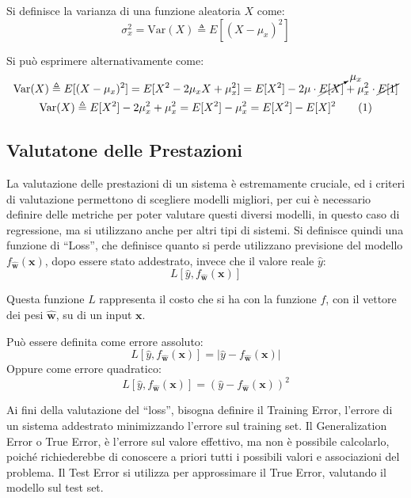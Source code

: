 \documentclass{article}
\numberwithin{equation}{subsection}
\newcommand{\tageq}{\tag{\stepcounter{equation}\theequation}}
\newcommand{\vect}[1]{\boldsymbol{\mathbf{#1}}}
\begin{document}
Si definisce la varianza di una funzione aleatoria $X$ come:
\begin{equation}
    \sigma^2_x=\text{Var}(X)\triangleq E[(X-\mu_x)^2]
\end{equation}

Si può esprimere alternativamente come:
\begin{gather*}
    \text{Var}(X)\triangleq E[(X-\mu_x)^2]=E[X^2-2\mu_xX+\mu_x^2]=E[X^2]-2\mu\cdot\cancelto{\mu_x}{E[X]}+\mu_x^2\cdot\cancel{E[1]}\\
    \text{Var}(X)\triangleq E[X^2]-2\mu_x^2+\mu_x^2=E[X^2]-\mu_x^2=E[X^2]-E[X]^2\tageq
\end{gather*}

\subsection{Valutatone delle Prestazioni}

La valutazione delle prestazioni di un sistema è estremamente cruciale, ed i criteri di 
valutazione permettono di scegliere modelli migliori, per cui è necessario definire 
delle metriche per poter valutare questi diversi modelli, in questo caso di regressione, ma si utilizzano anche per altri tipi di sistemi. Si definisce quindi una 
funzione di ``Loss'', che definisce quanto si perde utilizzano previsione del modello $f_{\vect{\hat{w}}}(\vect{x})$, dopo essere stato addestrato, invece che il valore reale $\hat{y}$:
\begin{equation}
    L[\hat{y}, f_{\vect{\hat{w}}}(\vect{x})]
\end{equation}

Questa funzione $L$ rappresenta il costo che si ha con la funzione $f$, con il vettore dei 
pesi $\vect{\hat{w}}$, su di un input $\vect{x}$. 

Può essere definita come errore assoluto:
\begin{equation*}
    L[\hat{y}, f_{\vect{\hat{w}}}(\vect{x})]=|\hat{y}- f_{\vect{\hat{w}}}(\vect{x})|
\end{equation*}
Oppure come errore quadratico:
\begin{equation*}
    L[\hat{y}, f_{\vect{\hat{w}}}(\vect{x})]=(\hat{y}- f_{\vect{\hat{w}}}(\vect{x}))^2
\end{equation*}

Ai fini della valutazione del ``loss'', bisogna definire il Training Error, l'errore di 
un sistema addestrato minimizzando l'errore sul training set. 
Il Generalization Error o True Error, è l'errore sul valore effettivo, ma non è possibile 
calcolarlo, poiché richiederebbe di conoscere a priori tutti i possibili valori e associazioni del problema. Il Test Error si utilizza per approssimare il True Error, 
valutando il modello sul test set. 
\end{document}

